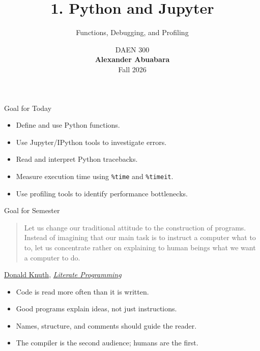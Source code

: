 \documentclass[aspectratio=43]{beamer}
\title{1. Python and Jupyter}
\subtitle{Functions, Debugging, and Profiling}
\author{}
\date{%
  \textcolor{AggieMaroon}{%
    DAEN 300\\
    \textbf{Alexander Abuabara}\\
    Fall 2026%
  }%
}
\begin{document}
\begin{frame}
  \titlepage
\end{frame}

\begin{frame}{Goal for Today}

\begin{itemize}
  \item Define and use Python functions.
  \item Use Jupyter/IPython tools to investigate errors.
  \item Read and interpret Python tracebacks.
  \item Measure execution time using \texttt{\%time} and \texttt{\%timeit}.
  \item Use profiling tools to identify performance bottlenecks.
\end{itemize}

\end{frame}

\begin{frame}{Goal for Semester}
\large

\begin{quote}
Let us change our traditional attitude to the construction of programs.
Instead of imagining that our main task is to instruct a computer what to to,
let us concentrate rather on explaining to human beings what we want a computer to do.
\end{quote}

\hfill 
\href{https://en.wikipedia.org/wiki/Donald_Knuth}{Donald Knuth}, 
\href{https://en.wikipedia.org/wiki/Literate_programming}{\emph{Literate Programming}}

\vspace{0.6cm}

\begin{itemize}
  \item Code is read more often than it is written.
  \item Good programs explain ideas, not just instructions.
  \item Names, structure, and comments should guide the reader.
  \item The compiler is the second audience; humans are the first.
\end{itemize}

\end{frame}
\end{document}
